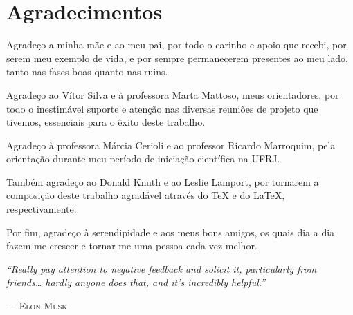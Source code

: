 
\dedication{Dedico este trabalho aos meus pais.}

\chapter*{Agradecimentos}

Agradeço a minha mãe e ao meu pai, por todo o carinho e apoio que recebi, por serem meu exemplo de vida, e por sempre permanecerem presentes ao meu lado, tanto nas fases boas quanto nas ruins.

Agradeço ao Vítor Silva e à professora Marta Mattoso, meus orientadores, por todo o inestimável suporte e atenção nas diversas reuniões de projeto que tivemos, essenciais para o êxito deste trabalho.

Agradeço à professora Márcia Cerioli e ao professor Ricardo Marroquim, pela orientação durante meu período de iniciação científica na UFRJ.




Também agradeço ao Donald Knuth e ao Leslie Lamport, por tornarem a composição deste trabalho agradável através do \TeX{} e do \LaTeX{}, respectivamente.

Por fim, agradeço à serendipidade e aos meus bons amigos, os quais dia a dia fazem-me crescer e tornar-me uma pessoa cada vez melhor.

\begin{center}
\end{center}

\vfill{}

\epigraph{\textit{``Really pay attention to negative feedback and solicit it, particularly from friends\ldots{} hardly anyone does that, and it's incredibly helpful.''}}{--- \textsc{Elon Musk}}
